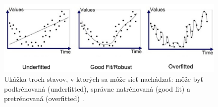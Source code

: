 \noindent
\begin{figure} \label{overf}
\includegraphics[width=\textwidth]{../img/overfit.png} 
\caption{Ukážka troch stavov, v ktorých sa môže sieť nachádzať: môže byť podtrénovaná (underfitted), správne natrénovaná (good fit) a pretrénovaná (overfitted) \citep{gitgud}.}
\end{figure}